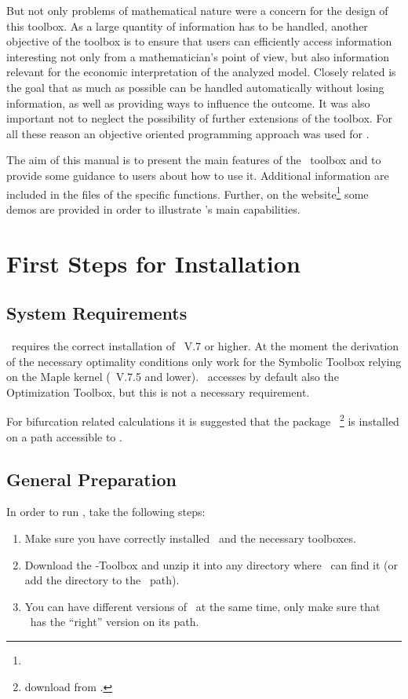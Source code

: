 But not only problems of mathematical nature were a concern for the design of this toolbox. As a large quantity of information has to be handled, another objective of the toolbox is to ensure that users can efficiently access information interesting not only from a mathematician's point of view, but also information relevant for the economic interpretation of the analyzed model. Closely related is the goal that as much as possible can be handled automatically without losing information, as well as providing ways to influence the outcome. It was also important not to neglect the possibility of further extensions of the toolbox. For all these reason an objective oriented programming approach was used for \OCMAT.

The aim of this manual is to present the main features of the \OCMAT\ toolbox and to provide some guidance to users about how to use it. Additional information are included in the files of the specific functions. Further, on the website\footnote{\httpOCMAT} some demos are provided in order to illustrate \OCMAT's main capabilities.

\section{First Steps for Installation}
\subsection*{System Requirements}
\OCMAT\ requires the correct installation of \MATL\ V.7 or higher. At the moment the derivation of the necessary optimality conditions only work for the Symbolic Toolbox relying on the Maple kernel (\MATL\ V.7.5 and lower). \OCMAT\ accesses by default also the Optimization Toolbox, but this is not a necessary requirement.

For bifurcation related calculations it is suggested that the package \CLMATCONT\ \footnote{download from \httpMATCONT.} is installed on a path accessible to \MATL.

\subsection*{General Preparation}
In order to run \OCMAT, take the following steps:
\begin{enumerate}
\item Make sure you have correctly installed \MATL\ and the necessary toolboxes.
\item Download the \OCMAT-Toolbox and unzip it into any directory where \MATL\ can find it (or add the directory to the \MATL\ path).
\item You can have different versions of \OCMAT\ at the same time, only make sure that \MATL\ has the ``right'' version on its path.
\end{enumerate}

